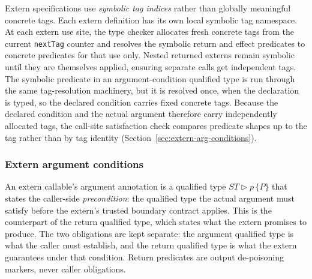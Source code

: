 \documentclass[12pt]{article}
\begin{document}
Extern specifications use \emph{symbolic tag indices} rather than globally
meaningful concrete tags. Each extern definition has its own local symbolic tag
namespace. At each extern use site, the type checker allocates fresh concrete
tags from the current \texttt{nextTag} counter and resolves the symbolic return
and effect predicates to concrete predicates for that use only. Nested returned
externs remain symbolic until they are themselves applied, ensuring separate
calls get independent tags. The symbolic predicate in an argument-condition
qualified type is run through the same tag-resolution machinery, but it is
resolved once, when the declaration is typed, so the declared condition carries
fixed concrete tags. Because the declared condition and the actual argument
therefore carry independently allocated tags, the call-site satisfaction check
compares predicate shapes up to the tag rather than by tag identity
(Section~\ref{sec:extern-arg-conditions}).

\subsubsection*{Extern argument conditions}
\label{sec:extern-arg-conditions}

An extern callable's argument annotation is a qualified type
\(\mathit{ST} \triangleright p \, \{ P \}\) that states the caller-side
\emph{precondition}: the qualified type the actual argument must satisfy before
the extern's trusted boundary contract applies. This is the counterpart of the
return qualified type, which states what the extern promises to produce. The two
obligations are kept separate: the argument qualified type is what the caller
must establish, and the return qualified type is what the extern guarantees under
that condition. Return predicates are
output de-poisoning markers, never caller obligations.
\end{document}
